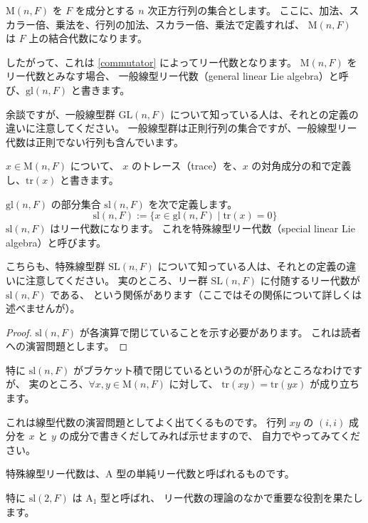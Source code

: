\documentclass{ltjsarticle}
\begin{document}
\begin{example}[一般線型リー代数]
    $\mathrm{M}(n,F)$ を $F$ を成分とする $n$ 次正方行列の集合とします。
    ここに、加法、スカラー倍、乗法を、行列の加法、スカラー倍、乗法で定義すれば、
    $\mathrm{M}(n,F)$ は $F$ 上の結合代数になります。

    したがって、これは \ref{commutator} によってリー代数となります。
    $\mathrm{M}(n,F)$ をリー代数とみなす場合、
    一般線型リー代数（general linear Lie algebra）と呼び、$\mathrm{gl}(n,F)$ と書きます。
\end{example}

余談ですが、一般線型群 $\mathrm{GL}(n,F)$ について知っている人は、それとの定義の違いに注意してください。
一般線型群は正則行列の集合ですが、一般線型リー代数は正則でない行列も含んでいます。

\begin{definition}[行列のトレース]
    $x \in \mathrm{M}(n,F)$ について、
    $x$ のトレース（trace）を、$x$ の対角成分の和で定義し、$\mathrm{tr}(x)$ と書きます。
\end{definition}

\begin{example}[特殊線型リー代数]
    $\mathrm{gl}(n,F)$ の部分集合 $\mathrm{sl}(n,F)$ を次で定義します。
    \[
        \mathrm{sl}(n,F) := \{x \in \mathrm{gl}(n,F) \mid \mathrm{tr}(x) = 0\}
    \]
    $\mathrm{sl}(n,F)$ はリー代数になります。
    これを特殊線型リー代数（special linear Lie algebra）と呼びます。
\end{example}

こちらも、特殊線型群 $\mathrm{SL}(n,F)$ について知っている人は、それとの定義の違いに注意してください。
実のところ、リー群 $\mathrm{SL}(n,F)$ に付随するリー代数が $\mathrm{sl}(n,F)$ である、
という関係があります（ここではその関係について詳しくは述べませんが）。

\begin{proof}
    $\mathrm{sl}(n,F)$ が各演算で閉じていることを示す必要があります。
    これは読者への演習問題とします。
\end{proof}

特に $\mathrm{sl}(n,F)$ がブラケット積で閉じているというのが肝心なところなわけですが、
実のところ、$\forall x,y \in \mathrm{M}(n,F)$ に対して、
$\mathrm{tr}(xy) = \mathrm{tr}(yx)$ が成り立ちます。

これは線型代数の演習問題としてよく出てくるものです。
行列 $xy$ の $(i,i)$ 成分を $x$ と $y$ の成分で書きくだしてみれば示せますので、
自力でやってみてください。

特殊線型リー代数は、$\mathrm{A}$ 型の単純リー代数と呼ばれるものです。

特に $\mathrm{sl}(2,F)$ は $\mathrm{A}_1$ 型と呼ばれ、
リー代数の理論のなかで重要な役割を果たします。
\end{document}
